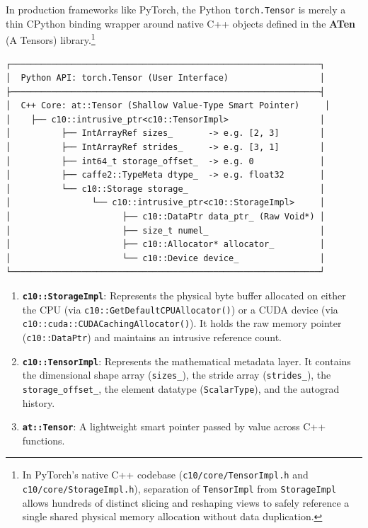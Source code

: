 \documentclass[
  letterpaper,
]{scrbook}
\providecommand{\tightlist}{%
  \setlength{\itemsep}{0pt}\setlength{\parskip}{0pt}}
\begin{document}
In production frameworks like PyTorch, the Python \texttt{torch.Tensor}
is merely a thin CPython binding wrapper around native C++ objects
defined in the \textbf{ATen} (A Tensors) library.\footnote{In PyTorch's
  native C++ codebase (\texttt{c10/core/TensorImpl.h} and
  \texttt{c10/core/StorageImpl.h}), separation of \texttt{TensorImpl}
  from \texttt{StorageImpl} allows hundreds of distinct slicing and
  reshaping views to safely reference a single shared physical memory
  allocation without data duplication.}

\begin{verbatim}
┌─────────────────────────────────────────────────────────────┐
│  Python API: torch.Tensor (User Interface)                  │
├─────────────────────────────────────────────────────────────┤
│  C++ Core: at::Tensor (Shallow Value-Type Smart Pointer)     │
│    ├── c10::intrusive_ptr<c10::TensorImpl>                  │
│          ├── IntArrayRef sizes_       -> e.g. [2, 3]        │
│          ├── IntArrayRef strides_     -> e.g. [3, 1]        │
│          ├── int64_t storage_offset_  -> e.g. 0             │
│          ├── caffe2::TypeMeta dtype_  -> e.g. float32       │
│          └── c10::Storage storage_                          │
│                └── c10::intrusive_ptr<c10::StorageImpl>     │
│                      ├── c10::DataPtr data_ptr_ (Raw Void*) │
│                      ├── size_t numel_                      │
│                      ├── c10::Allocator* allocator_         │
│                      └── c10::Device device_                │
└─────────────────────────────────────────────────────────────┘
\end{verbatim}

\begin{enumerate}
\def\labelenumi{\arabic{enumi}.}
\tightlist
\item
  \textbf{\texttt{c10::StorageImpl}}: Represents the physical byte
  buffer allocated on either the CPU (via
  \texttt{c10::GetDefaultCPUAllocator()}) or a CUDA device (via
  \texttt{c10::cuda::CUDACachingAllocator()}). It holds the raw memory
  pointer (\texttt{c10::DataPtr}) and maintains an intrusive reference
  count.
\item
  \textbf{\texttt{c10::TensorImpl}}: Represents the mathematical
  metadata layer. It contains the dimensional shape array
  (\texttt{sizes\_}), the stride array (\texttt{strides\_}), the
  \texttt{storage\_offset\_}, the element datatype
  (\texttt{ScalarType}), and the autograd history.
\item
  \textbf{\texttt{at::Tensor}}: A lightweight smart pointer passed by
  value across C++ functions.
\end{enumerate}
\end{document}
